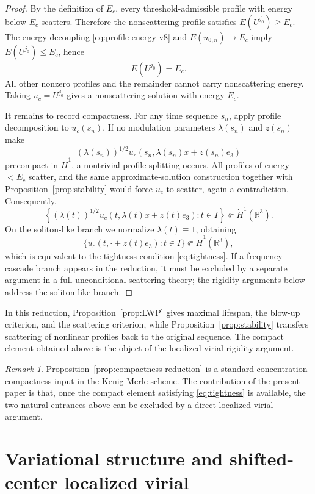\documentclass[preprint,12pt]{elsarticle}
\numberwithin{equation}{section}
\newcommand{\R}{\mathbb R}
\newcommand{\ez}{e_3}
\theoremstyle{remark}
\newtheorem{remark}[theorem]{Remark}
\begin{document}
\begin{proof}
By the definition of $E_c$, every threshold-admissible profile with energy below $E_c$ scatters.  Therefore the nonscattering profile satisfies $E(U^{j_0})\ge E_c$.  The energy decoupling \eqref{eq:profile-energy-v8} and $E(u_{0,n})\to E_c$ imply $E(U^{j_0})\le E_c$, hence
\[
  E(U^{j_0})=E_c.
\]
All other nonzero profiles and the remainder cannot carry nonscattering energy.  Taking $u_c=U^{j_0}$ gives a nonscattering solution with energy $E_c$.

It remains to record compactness.  For any time sequence $s_n$, apply profile decomposition to $u_c(s_n)$.  If no modulation parameters $\lambda(s_n)$ and $z(s_n)$ make
\[
  (\lambda(s_n))^{1/2}u_c(s_n,\lambda(s_n)x+z(s_n)\ez)
\]
precompact in $\dot H^1$, a nontrivial profile splitting occurs.  All profiles of energy $<E_c$ scatter, and the same approximate-solution construction together with Proposition~\ref{prop:stability} would force $u_c$ to scatter, again a contradiction.  Consequently,
\[
  \left\{(\lambda(t))^{1/2}u_c(t,\lambda(t)x+z(t)\ez):t\in I\right\}
  \Subset \dot H^1(\R^3).
\]
On the soliton-like branch we normalize $\lambda(t)\equiv1$, obtaining
\[
  \{u_c(t,\cdot+z(t)\ez):t\in I\}\Subset\dot H^1(\R^3),
\]
which is equivalent to the tightness condition \eqref{eq:tightness}.  If a frequency-cascade branch appears in the reduction, it must be excluded by a separate argument in a full unconditional scattering theory; the rigidity arguments below address the soliton-like branch.
\end{proof}

In this reduction, Proposition~\ref{prop:LWP} gives maximal lifespan, the blow-up criterion, and the scattering criterion, while Proposition~\ref{prop:stability} transfers scattering of nonlinear profiles back to the original sequence.  The compact element obtained above is the object of the localized-virial rigidity argument.

\begin{remark}
Proposition~\ref{prop:compactness-reduction} is a standard concentration-compactness input in the Kenig-Merle scheme.  The contribution of the present paper is that, once the compact element satisfying \eqref{eq:tightness} is available, the two natural entrances above can be excluded by a direct localized virial argument.
\end{remark}

\section{Variational structure and shifted-center localized virial}\label{sec:virial-prelim}
\end{document}
